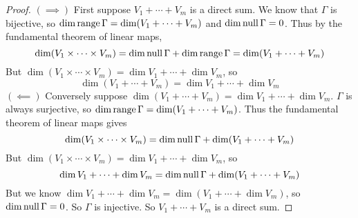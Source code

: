 \begin{proof}
    $(\implies)$ First suppose $V_1 + \cdots + V_m$ is a direct sum. We know that $\Gamma$ is bijective, so $\dim \operatorname{range} \Gamma = \dim(V_1 + \cdots + V_m)$ and $\dim\operatorname{null}\Gamma = 0$. Thus by the fundamental theorem of linear maps,
    \[ \dim(V_1 \times \cdots \times V_m) = \dim \operatorname{null} \Gamma + \dim \operatorname{range} \Gamma = \dim(V_1 + \cdots + V_m)\]
    But $\dim(V_1\times \cdots\times V_m) = \dim V_1 + \cdots + \dim V_m$, so 
    \[ \dim(V_1 + \cdots + V_m) = \dim V_1 + \cdots + \dim V_m\]
    $(\impliedby)$ Conversely suppose $\dim(V_1 + \cdots + V_m) = \dim V_1 + \cdots + \dim V_m$. $\Gamma$ is always surjective, so $\dim\operatorname{range}\Gamma = \dim(V_1 + \cdots + V_m)$. Thus the fundamental theorem of linear maps gives
    \[ \dim(V_1\times \cdots\times V_m) = \dim \operatorname{null}\Gamma + \dim(V_1 + \cdots + V_m) \]
    But $\dim(V_1 \times \cdots \times V_m) = \dim V_1 + \cdots + \dim V_m$, so
    \[ \dim V_1 + \cdots + \dim V_m  =\dim \operatorname{null} \Gamma + \dim(V_1 + \cdots + V_m) \]
    But we know $\dim V_1 + \cdots + \dim V_m = \dim(V_1 + \cdots + \dim V_m)$, so $\dim\operatorname{null}\Gamma = 0$. So $\Gamma$ is injective. So $V_1 + \cdots + V_m$ is a direct sum.
\end{proof}
